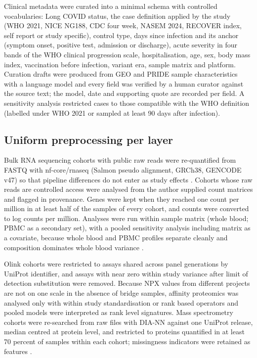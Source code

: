 \documentclass[unnumsec,webpdf,contemporary,large]{oup-authoring-template}
\begin{document}
Clinical metadata were curated into a minimal schema with controlled vocabularies: Long COVID status, the case definition applied by the study (WHO 2021, NICE NG188, CDC four week, NASEM 2024, RECOVER index, self report or study specific), control type, days since infection and its anchor (symptom onset, positive test, admission or discharge), acute severity in four bands of the WHO clinical progression scale, hospitalisation, age, sex, body mass index, vaccination before infection, variant era, sample matrix and platform. Curation drafts were produced from GEO and PRIDE sample characteristics with a language model and every field was verified by a human curator against the source text; the model, date and supporting quote are recorded per field. A sensitivity analysis restricted cases to those compatible with the WHO definition (labelled under WHO 2021 or sampled at least 90 days after infection).

\subsection{Uniform preprocessing per layer}\label{sec:preproc}

Bulk RNA sequencing cohorts with public raw reads were re-quantified from FASTQ with nf-core/rnaseq (Salmon pseudo alignment, GRCh38, GENCODE v47) so that pipeline differences do not enter as study effects \citep{wang2018,arora2020}. Cohorts whose raw reads are controlled access were analysed from the author supplied count matrices and flagged in provenance. Genes were kept when they reached one count per million in at least half of the samples of every cohort, and counts were converted to log counts per million. Analyses were run within sample matrix (whole blood; PBMC as a secondary set), with a pooled sensitivity analysis including matrix as a covariate, because whole blood and PBMC profiles separate cleanly and composition dominates whole blood variance \citep{gautam2019,oconnell2023}.

Olink cohorts were restricted to assays shared across panel generations by UniProt identifier, and assays with near zero within study variance after limit of detection substitution were removed. Because NPX values from different projects are not on one scale in the absence of bridge samples, affinity proteomics was analysed only with within study standardisation or rank based operators and pooled models were interpreted as rank level signatures. Mass spectrometry cohorts were re-searched from raw files with DIA-NN against one UniProt release, median centred at protein level, and restricted to proteins quantified in at least 70 percent of samples within each cohort; missingness indicators were retained as features \citep{voss2022,cuklina2021}.
\end{document}
